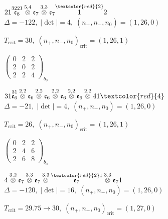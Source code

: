 \documentclass[10pt]{article}
\begin{document}
\smallskip

$21\overset{3221}{\mathfrak{e}_8}\overset{5,4}{\otimes}\mathfrak{e}_7\overset{3,3}{\otimes}\mathfrak{e}_7\overset{\textcolor{red}{2}}{1}2$ \quad $\Delta=-122,\; |\det|=4,\; (n_+,n_-,n_0)=(1,26,0)$

\hspace{1em}$T_{\text{crit}}=30,\; (n_+,n_-,n_0)_{\text{crit}}=(1,26,1)$

\hspace{2em}$\left(\begin{smallmatrix}0 & 2 & 2 \\ 2 & 0 & 2 \\ 2 & 2 & 4\end{smallmatrix}\right)_{\!b_0}$

\smallskip

$31\overset{31}{\mathfrak{e}_6}\overset{2,2}{\otimes}\mathfrak{e}_6\overset{2,2}{\otimes}\mathfrak{e}_6\overset{2,2}{\otimes}\mathfrak{e}_6\overset{2,2}{\otimes}\mathfrak{e}_6\overset{2,2}{\otimes}41\textcolor{red}{4}$ \quad $\Delta=-21,\; |\det|=4,\; (n_+,n_-,n_0)=(1,26,0)$

\hspace{1em}$T_{\text{crit}}=26,\; (n_+,n_-,n_0)_{\text{crit}}=(1,26,1)$

\hspace{2em}$\left(\begin{smallmatrix}0 & 2 & 2 \\ 2 & 4 & 6 \\ 2 & 6 & 8\end{smallmatrix}\right)_{\!b_0}$

\smallskip

$4\overset{3,2}{\otimes}\mathfrak{e}_7\overset{3,3}{\otimes}\mathfrak{e}_7\overset{3,3}{\otimes}\overset{\textcolor{red}{2}1}{\mathfrak{e}_7}\overset{3,3}{\otimes}\mathfrak{e}_71$ \quad $\Delta=-120,\; |\det|=16,\; (n_+,n_-,n_0)=(1,26,0)$

\hspace{1em}$T_{\text{crit}}=29.75 \to 30,\; (n_+,n_-,n_0)_{\text{crit}}=(1,27,0)$
\end{document}
